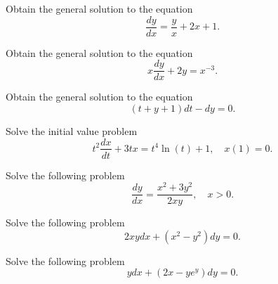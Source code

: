 \documentclass[11pt]{article}
\begin{document}
\begin{problem}
Obtain the general solution to the equation
\begin{equation*}
      \dfrac{ dy }{dx} = \frac{y }{x} + 2 x + 1.
\end{equation*}
\end{problem}


\begin{problem}
Obtain the general solution to the equation
\begin{equation*}
      x \dfrac{ dy }{dx}+ 2 y = x^{-3}.
\end{equation*}
\end{problem}


\begin{problem}
Obtain the general solution to the equation
\begin{equation*}
     (t+y+1)dt -  dy =0 .
\end{equation*}
\end{problem}

\begin{problem}
Solve the initial value problem
\begin{equation*}
     t^2 \dfrac{ dx }{dt} + 3 t x = t^4 \ln(t) +1 , \quad x(1) =0. 
\end{equation*}
\end{problem}


\begin{problem}
Solve the following problem
\begin{equation*}
\frac{dy}{dx}=\frac{x^{2}+3y^{2}}{2xy}, \quad x>0. 
\end{equation*}
\end{problem}


\begin{problem}
Solve the following problem
\begin{equation*}
2xy dx+(x^{2}-y^{2})dy=0. 
\end{equation*}
\end{problem}


\begin{problem}
Solve the following problem
\begin{equation*}
ydx + (2x - y e^{y}) dy = 0.
\end{equation*}
\end{problem}
\end{document}
